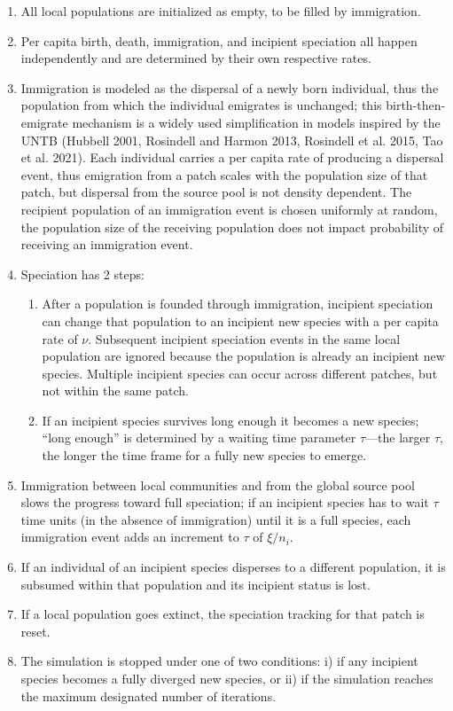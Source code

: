 \documentclass[
  letterpaper,
  DIV=11,
  numbers=noendperiod]{scrartcl}
\providecommand{\tightlist}{%
  \setlength{\itemsep}{0pt}\setlength{\parskip}{0pt}}
\begin{document}
\begin{enumerate}
\def\labelenumi{\arabic{enumi}.}
\tightlist
\item
  All local populations are initialized as empty, to be filled by
  immigration.
\item
  Per capita birth, death, immigration, and incipient speciation all
  happen independently and are determined by their own respective rates.
\item
  Immigration is modeled as the dispersal of a newly born individual,
  thus the population from which the individual emigrates is unchanged;
  this birth-then-emigrate mechanism is a widely used simplification in
  models inspired by the UNTB (Hubbell 2001, Rosindell and Harmon 2013,
  Rosindell et al. 2015, Tao et al. 2021). Each individual carries a per
  capita rate of producing a dispersal event, thus emigration from a
  patch scales with the population size of that patch, but dispersal
  from the source pool is not density dependent. The recipient
  population of an immigration event is chosen uniformly at random, the
  population size of the receiving population does not impact
  probability of receiving an immigration event.
\item
  Speciation has 2 steps:

  \begin{enumerate}
  \def\labelenumii{\roman{enumii}.}
  \tightlist
  \item
    After a population is founded through immigration, incipient
    speciation can change that population to an incipient new species
    with a per capita rate of \(\nu\). Subsequent incipient speciation
    events in the same local population are ignored because the
    population is already an incipient new species. Multiple incipient
    species can occur across different patches, but not within the same
    patch.
  \item
    If an incipient species survives long enough it becomes a new
    species; ``long enough'' is determined by a waiting time parameter
    \(\tau\)---the larger \(\tau\), the longer the time frame for a
    fully new species to emerge.
  \end{enumerate}
\item
  Immigration between local communities and from the global source pool
  slows the progress toward full speciation; if an incipient species has
  to wait \(\tau\) time units (in the absence of immigration) until it
  is a full species, each immigration event adds an increment to
  \(\tau\) of \(\xi / n_i\).
\item
  If an individual of an incipient species disperses to a different
  population, it is subsumed within that population and its incipient
  status is lost.
\item
  If a local population goes extinct, the speciation tracking for that
  patch is reset.
\item
  The simulation is stopped under one of two conditions: i) if any
  incipient species becomes a fully diverged new species, or ii) if the
  simulation reaches the maximum designated number of iterations.
\end{enumerate}
\end{document}
